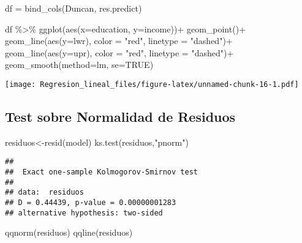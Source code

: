 \documentclass[
]{article}
\newenvironment{Shaded}{\begin{snugshade}}{\end{snugshade}}
\newcommand{\AttributeTok}[1]{\textcolor[rgb]{0.77,0.63,0.00}{#1}}
\newcommand{\ConstantTok}[1]{\textcolor[rgb]{0.00,0.00,0.00}{#1}}
\newcommand{\FunctionTok}[1]{\textcolor[rgb]{0.00,0.00,0.00}{#1}}
\newcommand{\NormalTok}[1]{#1}
\newcommand{\OtherTok}[1]{\textcolor[rgb]{0.56,0.35,0.01}{#1}}
\newcommand{\SpecialCharTok}[1]{\textcolor[rgb]{0.00,0.00,0.00}{#1}}
\newcommand{\StringTok}[1]{\textcolor[rgb]{0.31,0.60,0.02}{#1}}
\begin{document}
\begin{Shaded}
\begin{Highlighting}[]
\NormalTok{df }\OtherTok{=} \FunctionTok{bind\_cols}\NormalTok{(Duncan, res.predict)}

\NormalTok{df }\SpecialCharTok{\%\textgreater{}\%} 
  \FunctionTok{ggplot}\NormalTok{(}\FunctionTok{aes}\NormalTok{(}\AttributeTok{x=}\NormalTok{education, }\AttributeTok{y=}\NormalTok{income))}\SpecialCharTok{+}
  \FunctionTok{geom\_point}\NormalTok{()}\SpecialCharTok{+}
  \FunctionTok{geom\_line}\NormalTok{(}\FunctionTok{aes}\NormalTok{(}\AttributeTok{y=}\NormalTok{lwr), }\AttributeTok{color =} \StringTok{"red"}\NormalTok{, }\AttributeTok{linetype =} \StringTok{"dashed"}\NormalTok{)}\SpecialCharTok{+}
  \FunctionTok{geom\_line}\NormalTok{(}\FunctionTok{aes}\NormalTok{(}\AttributeTok{y=}\NormalTok{upr), }\AttributeTok{color =} \StringTok{"red"}\NormalTok{, }\AttributeTok{linetype =} \StringTok{"dashed"}\NormalTok{)}\SpecialCharTok{+}
  \FunctionTok{geom\_smooth}\NormalTok{(}\AttributeTok{method=}\NormalTok{lm, }\AttributeTok{se=}\ConstantTok{TRUE}\NormalTok{) }
\end{Highlighting}
\end{Shaded}

\texttt{[image: Regresion\_lineal\_files/figure-latex/unnamed-chunk-16-1.pdf]}

\hypertarget{test-sobre-normalidad-de-residuos}{%
\subsection{Test sobre Normalidad de
Residuos}\label{test-sobre-normalidad-de-residuos}}

\begin{Shaded}
\begin{Highlighting}[]
\NormalTok{residuos}\OtherTok{\textless{}{-}}\FunctionTok{resid}\NormalTok{(model)}
\FunctionTok{ks.test}\NormalTok{(residuos,}\StringTok{"pnorm"}\NormalTok{)}
\end{Highlighting}
\end{Shaded}

\begin{verbatim}
## 
##  Exact one-sample Kolmogorov-Smirnov test
## 
## data:  residuos
## D = 0.44439, p-value = 0.00000001283
## alternative hypothesis: two-sided
\end{verbatim}

\begin{Shaded}
\begin{Highlighting}[]
\FunctionTok{qqnorm}\NormalTok{(residuos)}
\FunctionTok{qqline}\NormalTok{(residuos)}
\end{Highlighting}
\end{Shaded}
\end{document}
